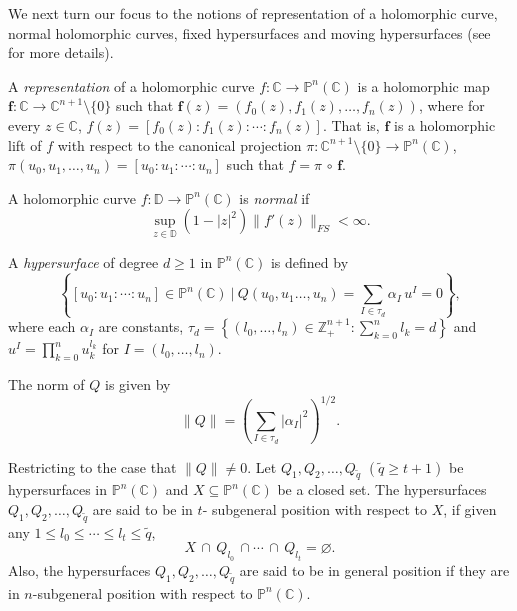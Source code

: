 \documentclass[11pt, reqno]{amsart}
\theoremstyle{definition}
\theoremstyle{remark}
\numberwithin{equation}{section}
\begin{document}
We next turn our focus to the notions of representation of a holomorphic curve, normal holomorphic curves, fixed 
hypersurfaces and moving hypersurfaces (see \cite{ere-nhcfprtps-2007, ere-bcoh-2008, deth-nfommoscvfmhiacps-2015, yang-anotacfnf-2020, yang-hmitcpswmh-2021} for more details).%

A \emph{representation} of a holomorphic curve $f : \mathbb{C} \to \mathbb{P}^n(\mathbb{C})$ is a holomorphic map 
$\mathbf f:\mathbb C\to\mathbb C^{n+1}\setminus\{0\}$ such that $\mathbf{f}(z)=(f_0(z),f_1(z), \dots, f_n(z))$, where for every $z\in\mathbb C$, $f(z)=[f_0(z):f_1(z):\cdots:f_n(z)]$. That is, $\mathbf f$ is a holomorphic lift of $f$ with respect to the canonical projection $\pi:\mathbb C^{n+1}\setminus\{0\}\to\mathbb P^n(\mathbb C)$, $\pi(u_0,u_1,\dots,u_n)=[u_0:u_1:\cdots:u_n]$ such that $f=\pi\,\circ\,\mathbf f$.
\smallskip

A holomorphic curve $f:\mathbb{D} \to \mathbb P^n(\mathbb C)$ is \emph{normal} if
\begin{equation*}\sup_{z\in \mathbb{D}}(1-|z|^2)\|f'(z)\|_{FS}<\infty.\end{equation*}

A \textit{hypersurface} of degree $d\geq 1$ in $\mathbb{P}^n(\mathbb{C})$ is defined by
\begin{equation*}\left\{ [u_0:u_1:\cdots:u_n]\in\mathbb P^n(\mathbb C)\ |\ Q(u_0,u_1\ldots,u_n)= \sum_{I \in \tau_d} \alpha_I \, u^I = 0\right\},\end{equation*}
where each $\alpha_I$ are constants, $\tau_d = \left\{ (l_0,\ldots,l_n) \in \mathbb Z_{+}^{n+1} : \sum_{k=0}^n l_k= d \right\}$ 
and $u^I = \prod_{k=0}^n u_k^{l_k}$ for 
$I = (l_0,\ldots,l_n)$. \smallskip

The norm of $Q$ is given by
$$\|Q\|=\left( \sum_{I \in \tau_d} |\alpha_I|^2 \right)^{1/2}.$$\smallskip

Restricting to the case that $\|Q\|\neq 0$. Let $Q_1,Q_2,\ldots,Q_{\tilde q}$ $(\tilde q \geq t+1)$ be hypersurfaces 
in $\mathbb P^n(\mathbb{C})$ and $X\subseteq\mathbb P^n(\mathbb C)$ be a closed set.
The hypersurfaces $Q_1,Q_2,\ldots,Q_{\tilde q}$ are said to be in $t$-
subgeneral position with respect to $X$, if given any $1\le l_0\le\cdots\le l_t\le \tilde q$, \begin{equation*}
    X\,\cap\,Q_{l_0}\,\cap\cdots\,\cap\,Q_{l_t}=\varnothing. 
\end{equation*}
Also, the hypersurfaces $Q_1,Q_2,\dots,Q_{\tilde q}$ are said to be in general position if they are in $n$-subgeneral position with respect to $\mathbb P^n(\mathbb C)$.\smallskip
\end{document}
